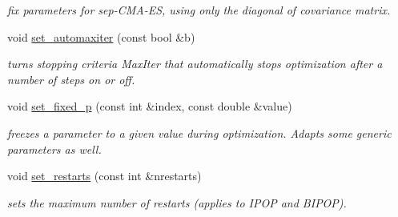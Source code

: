 \begin{DoxyCompactItemize}
\begin{DoxyCompactList}\small\item\em fix parameters for sep-\/\-C\-M\-A-\/\-E\-S, using only the diagonal of covariance matrix. \end{DoxyCompactList}\item 
void \hyperlink{classlibcmaes_1_1CMAParameters_a7fcd592c259dca6716fdbe735fd1b837}{set\-\_\-automaxiter} (const bool \&b)
\begin{DoxyCompactList}\small\item\em turns stopping criteria Max\-Iter that automatically stops optimization after a number of steps on or off. \end{DoxyCompactList}\item 
void \hyperlink{classlibcmaes_1_1CMAParameters_a73af8cdc07dc3388c40a27ddbdea96b4}{set\-\_\-fixed\-\_\-p} (const int \&index, const double \&value)
\begin{DoxyCompactList}\small\item\em freezes a parameter to a given value during optimization. Adapts some generic parameters as well. \end{DoxyCompactList}\item 
void \hyperlink{classlibcmaes_1_1CMAParameters_a105789bdd00467411107db57302028f2}{set\-\_\-restarts} (const int \&nrestarts)
\begin{DoxyCompactList}\small\item\em sets the maximum number of restarts (applies to I\-P\-O\-P and B\-I\-P\-O\-P). \end{DoxyCompactList}\end{DoxyCompactItemize}
